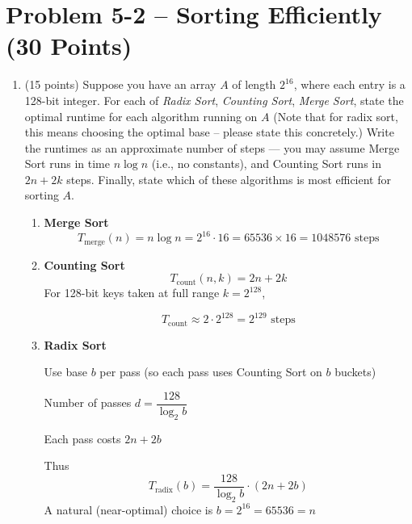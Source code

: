 
\section*{Problem 5-2 -- Sorting Efficiently (30 Points)}

\begin{enumerate}
	\item (15 points)
	Suppose you have an array $A$ of length $2^{16}$, where each entry is a 128-bit integer. For each of \emph{Radix Sort}, \emph{Counting Sort}, \emph{Merge Sort}, state the optimal runtime for each algorithm running on $A$ (Note that for radix sort, this means choosing the optimal base -- please state this concretely.) Write the runtimes as an approximate number of steps — you may assume Merge Sort runs in time $n\log n$ (i.e., no constants), and Counting Sort runs in $2n+2k$ steps. Finally, state which of these algorithms is most efficient for sorting $A$.
	
	\begin{solution}
		\vspace{0.5 cm}



        \begin{enumerate}
        

  \item \textbf{Merge Sort}
  \[
    T_{\text{merge}}(n)=n\log n = 2^{16}\cdot 16 = 65536\times 16 = 1048576 \text{ steps}
  \]

  \item \textbf{Counting Sort}
  \[
    T_{\text{count}}(n,k)=2n+2k
  \]
  For 128-bit keys taken at full range \(k=2^{128}\),
  
  \[
    T_{\text{count}} \approx 2\cdot 2^{128} = 2^{129} \text{ steps}
  \]

  \item \textbf{Radix Sort} 
  
  Use base \(b\) per pass (so each pass uses Counting Sort on \(b\) buckets)

  
  Number of passes \(d=\dfrac{128}{\log_2 b}\)
  
  Each pass costs \(2n+2b\)
  
  Thus
  \[
    T_{\text{radix}}(b)=\frac{128}{\log_2 b}\cdot(2n+2b)
  \]
  A natural (near-optimal) choice is \(b=2^{16}=65536=n\)
  

\end{enumerate}
\end{solution}
\end{enumerate}
